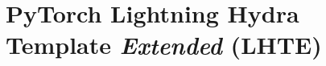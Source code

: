 

\section[toc={Lightning Hydra Template \emph{Ext}}]{{PyTorch Lightning Hydra Template \emph{Extended} (LHTE)}}

\begin{emptyslide}[toc={}]{}
\vspace{-1.1pt}
\end{emptyslide}

